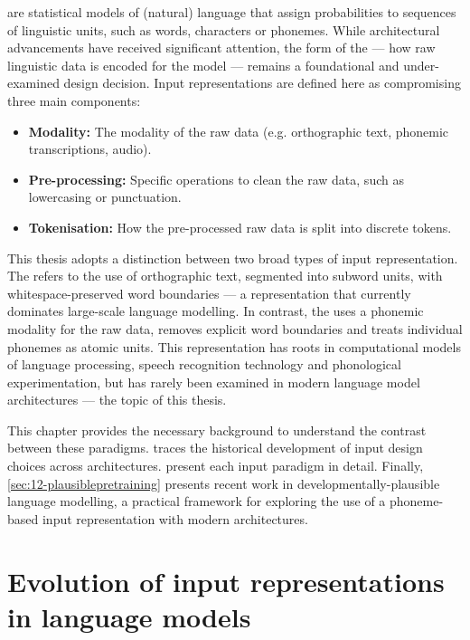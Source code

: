  are statistical models of (natural) language that assign probabilities to sequences of linguistic units, such as words, characters or phonemes. While architectural advancements have received significant attention, the form of the  --- how raw linguistic data is encoded for the model --- remains a foundational and under-examined design decision. Input representations are defined here as compromising three main components:

\begin{itemize}
    \item \textbf{Modality:} The modality of the raw data (e.g. orthographic text, phonemic transcriptions, audio).
    \item \textbf{Pre-processing:} Specific operations to clean the raw data, such as lowercasing or punctuation. 
    \item \textbf{Tokenisation:} How the pre-processed raw data is split into discrete tokens.
\end{itemize}

This thesis adopts a distinction between two broad types of input representation. The  refers to the use of orthographic text, segmented into subword units, with whitespace-preserved word boundaries --- a representation that currently dominates large-scale language modelling. In contrast, the  uses a phonemic modality for the raw data, removes explicit word boundaries and treats individual phonemes as atomic units. This representation has roots in computational models of language processing, speech recognition technology and phonological experimentation, but has rarely been examined in modern language model architectures --- the topic of this thesis.

This chapter provides the necessary background to understand the contrast between these paradigms.  traces the historical development of input design choices across architectures.  present each input paradigm in detail. Finally, \cref{sec:12-plausiblepretraining} presents recent work in developmentally-plausible language modelling, a practical framework for exploring the use of a phoneme-based input representation with modern architectures.

\section{Evolution of input representations in language models}\label{sec:12-architectures}

